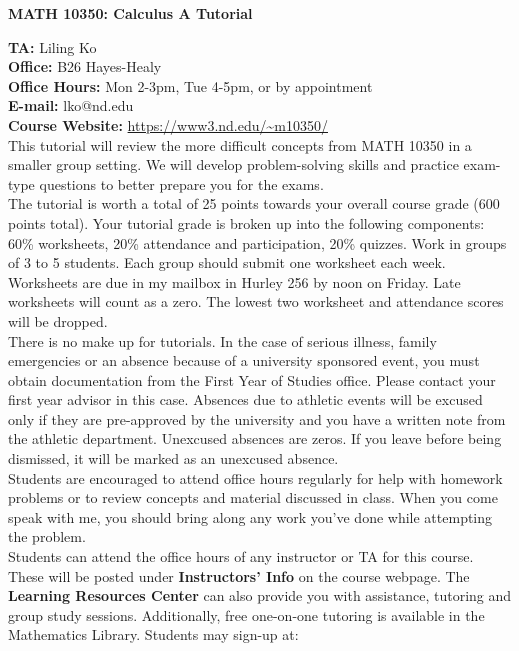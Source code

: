 \documentclass{article}[12pt]
\begin{document}
\begin{center}{\bf MATH 10350: Calculus A Tutorial} \end{center}
{\bf TA:} Liling Ko\\
{\bf Office:} B26 Hayes-Healy\\
{\bf Office Hours:} Mon 2-3pm, Tue 4-5pm, or by appointment\\
{\bf E-mail:} lko@nd.edu\\
{\bf Course Website:} \url{https://www3.nd.edu/~m10350/}\\

 This tutorial will review the more difficult
concepts from MATH 10350 in a smaller group setting. We will develop
problem-solving skills and practice exam-type questions to better prepare
you for the exams.\\

 The tutorial is worth a total of 25 points
towards your overall course grade (600 points total). Your tutorial grade
is broken up into the following components: 60\% worksheets, 20\%
attendance and participation, 20\% quizzes. Work in groups of 3 to 5
students. Each group should submit one worksheet each week. Worksheets are
due in my mailbox in Hurley 256 by noon on Friday. Late worksheets will
count as a zero. The lowest two worksheet and attendance scores will be
dropped. \\

 There is no make up for tutorials. In the case
of serious illness, family emergencies or an absence because of a
university sponsored event, you must obtain documentation from the First
Year of Studies office. Please contact your first year advisor in this
case. Absences due to athletic events will be excused only if they are
pre-approved by the university and you have a written note from the
athletic department. Unexcused absences are zeros. If you leave before
being dismissed, it will be marked as an unexcused absence. \\

 Students are encouraged to attend office
hours regularly for help with homework problems or to review concepts and
material discussed in class. When you come speak with me, you should bring
along any work you've done while attempting the problem.\\

 Students can attend the office hours of any
instructor or TA for this course. These will be posted under {\bf
Instructors' Info} on the course webpage. The {\bf Learning Resources
Center} can also provide you with assistance, tutoring and group study
sessions. Additionally, free one-on-one tutoring is available in the
Mathematics Library. Students may sign-up at:
\end{document}
